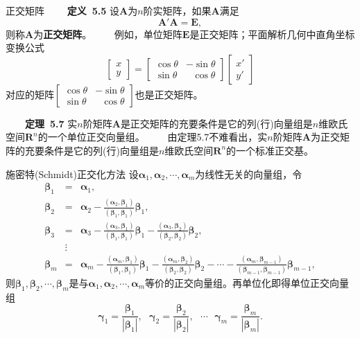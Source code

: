 \documentclass[compress,mathserif,cjk]{beamer}
\theoremstyle{remark}
\numberwithin{equation}{section}
\newcommand{\hei}{\bf}      %
\begin{document}
\begin{CJK}{UTF8}{gbsn}
\begin{frame}{正交矩阵}
\ \ \ \ {\hei 定义~5.5} 设$\bm A$为$n$阶实矩阵，如果$\bm A$满足
$$\bm A'\bm A=\bm E,$$
则称$\bm A$为{\hei 正交矩阵}。
\pause\vskip 5pt
\ \ \ \ 例如，单位矩阵$\bm E$是正交矩阵；平面解析几何中直角坐标变换公式
$$\left[\begin{matrix}x\\y\end{matrix}\right]=\left[\begin{matrix}\cos\theta&-\sin\theta\\ \sin\theta&~~~\cos\theta\end{matrix}\right]
\left[\begin{matrix}x'\\y'\end{matrix}\right]$$
对应的矩阵$\left[\begin{matrix}\cos\theta&-\sin\theta\\ \sin\theta&~~~\cos\theta\end{matrix}\right]$也是正交矩阵。

\end{frame}

\begin{frame}
\ \ \ \ {\hei 定理~5.7} 实$n$阶矩阵$\bm A$是正交矩阵的充要条件是它的列(行)向量组是$n$维欧氏空间$\mathbf R^n$的一个单位正交向量组。
\pause\vskip 10pt
\ \ \ \ 由定理5.7不难看出，实$n$阶矩阵$\bm A$为正交矩阵的充要条件是它的列(行)向量组是$n$维欧氏空间$\mathbf R^n$的一个标准正交基。


\end{frame}

\begin{frame}{施密特(Schmidt)正交化方法}\small
设$\bm\alpha_1,\bm\alpha_2,\cdots,\bm\alpha_m$为线性无关的向量组，令
\begin{eqnarray*}
\bm\beta_1&=&\bm\alpha_1,\\
\bm\beta_2&=&\bm\alpha_2-\frac{(\bm\alpha_2,\bm\beta_1)}{(\bm\beta_1,\bm\beta_1)}\bm\beta_1,\\
\bm\beta_3&=&\bm\alpha_3-\frac{(\bm\alpha_3,\bm\beta_1)}{(\bm\beta_1,\bm\beta_1)}\bm\beta_1-\frac{(\bm\alpha_3,\bm\beta_2)}{(\bm\beta_2,\bm\beta_2)}\bm\beta_2,\\
&\vdots&\\
\bm\beta_m&=&\bm\alpha_m-\frac{(\bm\alpha_m,\bm\beta_1)}{(\bm\beta_1,\bm\beta_1)}\bm\beta_1-\frac{(\bm\alpha_m,\bm\beta_2)}{(\bm\beta_2,\bm\beta_2)}\bm\beta_2-\cdots
-\frac{(\bm\alpha_m,\bm\beta_{m-1})}{(\bm\beta_{m-1},\bm\beta_{m-1})}\bm\beta_{m-1},
\end{eqnarray*}
则$\bm\beta_1,\bm\beta_2,\cdots,\bm\beta_m$是与$\bm\alpha_1,\bm\alpha_2,\cdots,\bm\alpha_m$等价的正交向量组。\pause 再单位化即得单位正交向量组
$$\bm\gamma_1=\frac{\bm\beta_1}{|\bm\beta_1|},~~~\bm\gamma_2=\frac{\bm\beta_2}{|\bm\beta_2|},~~~\cdots~~~\bm\gamma_m=\frac{\bm\beta_m}{|\bm\beta_m|}.$$
\end{frame}


\end{CJK}
\end{document}
